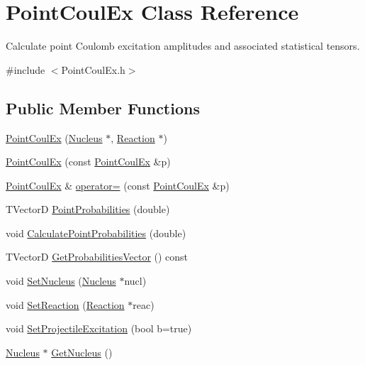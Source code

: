 \hypertarget{classPointCoulEx}{\section{Point\-Coul\-Ex Class Reference}
\label{classPointCoulEx}
}


Calculate point Coulomb excitation amplitudes and associated statistical tensors.  




{\ttfamily \#include $<$Point\-Coul\-Ex.\-h$>$}

\subsection*{Public Member Functions}
\begin{DoxyCompactItemize}
\item 
\hyperlink{classPointCoulEx_a9246400fa6440b3628cdb3010e733f3c}{Point\-Coul\-Ex} (\hyperlink{classNucleus}{Nucleus} $\ast$, \hyperlink{classReaction}{Reaction} $\ast$)
\item 
\hyperlink{classPointCoulEx_ae304214fe53d62d39b1413bf179bd0bd}{Point\-Coul\-Ex} (const \hyperlink{classPointCoulEx}{Point\-Coul\-Ex} \&p)
\item 
\hyperlink{classPointCoulEx}{Point\-Coul\-Ex} \& \hyperlink{classPointCoulEx_ac812c4e40026a7becd63c583b63aaf43}{operator=} (const \hyperlink{classPointCoulEx}{Point\-Coul\-Ex} \&p)
\item 
T\-Vector\-D \hyperlink{classPointCoulEx_ae3636eacee3ab0f37d0b8c927d779387}{Point\-Probabilities} (double)
\item 
void \hyperlink{classPointCoulEx_a350a143e891ac63bb7088559a20081dc}{Calculate\-Point\-Probabilities} (double)
\item 
T\-Vector\-D \hyperlink{classPointCoulEx_a7af998470e383eb70c74c3dae33a85b6}{Get\-Probabilities\-Vector} () const 
\item 
void \hyperlink{classPointCoulEx_a8e109cc21be7be0abb69fb561bab4dcf}{Set\-Nucleus} (\hyperlink{classNucleus}{Nucleus} $\ast$nucl)
\item 
void \hyperlink{classPointCoulEx_a2b3413601d938ca86e6ccf0aa8e09f37}{Set\-Reaction} (\hyperlink{classReaction}{Reaction} $\ast$reac)
\item 
void \hyperlink{classPointCoulEx_aea871d21af150c2ca49c95be891bc717}{Set\-Projectile\-Excitation} (bool b=true)
\item 
\hyperlink{classNucleus}{Nucleus} $\ast$ \hyperlink{classPointCoulEx_a0190b4e42074c4198e80f3403d25b14e}{Get\-Nucleus} ()

\end{DoxyCompactItemize}
